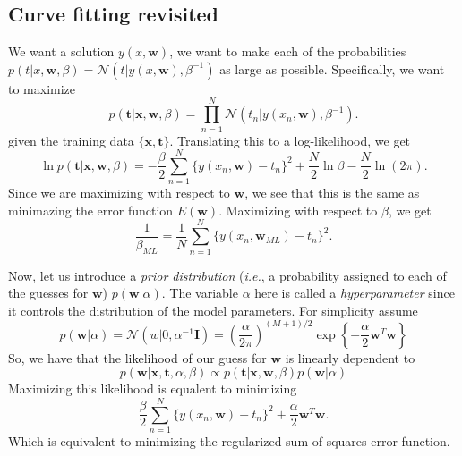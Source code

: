 \documentclass[11pt]{article}
\begin{document}
\subsection{Curve fitting revisited}
We want a solution $y(x, \textbf{w})$, we want to make each of the
probabilities
$p(t|x,\textbf{w}, \beta) = \mathcal{N}(t|y(x, \textbf{w}), \beta^{-1})$ as
large as possible. Specifically, we want to maximize
\begin{equation*}
  p(\textbf{t}|\textbf{x}, \textbf{w}, \beta) =
  \prod_{n=1}^N \mathcal{N}(t_n | y(x_n, \textbf{w}), \beta^{-1}).
\end{equation*}
given the training data $\{\textbf{x}, \textbf{t}\}$. Translating this to a
log-likelihood, we get
\begin{equation*}
  \ln p(\textbf{t}|\textbf{x}, \textbf{w}, \beta) =
  -\frac{\beta}{2}
  \sum_{n=1}^N \{y(x_n, \textbf{w}) - t_n\}^2 + \frac{N}{2} \ln \beta
  - \frac{N}{2} \ln (2\pi).
\end{equation*}
Since we are maximizing with respect to $\textbf{w}$, we see that this is the
same as minimazing the error function $E(\textbf{w})$. Maximizing with respect
to $\beta$, we get
\begin{equation*}
  \frac{1}{\beta_{ML}} =
  \frac{1}{N} \sum_{n=1}^N \{y(x_n, \textbf{w}_{ML}) - t_n\}^2.
\end{equation*}

Now, let us introduce a \textit{prior distribution} (\textit{i.e.}, a
probability assigned to each of the guesses for $\textbf{w}$)
$p(\textbf{w}|\alpha)$. The variable $\alpha$ here is called a
\textit{hyperparameter} since it controls the distribution of the model
parameters. For simplicity assume
\begin{equation*}
  p(\textbf{w}|\alpha) =
  \mathcal{N}(w|0, \alpha^{-1} \textbf{I}) =
  \left( \frac{\alpha}{2\pi}\right)^{(M+1)/2}
  \exp \left\{ -\frac{\alpha}{2}\textbf{w}^T\textbf{w} \right\}
\end{equation*}
So, we have that the likelihood of our guess for $\textbf{w}$ is linearly
dependent to
\begin{equation*}
  p(\textbf{w}|\textbf{x}, \textbf{t}, \alpha, \beta) \propto
  p(\textbf{t}|\textbf{x}, \textbf{w}, \beta)p(\textbf{w}|\alpha)
\end{equation*}
Maximizing this likelihood is equalent to minimizing
\begin{equation*}
  \frac{\beta}{2} \sum_{n=1}^N \{y(x_n, \textbf{w})-t_n\}^2 +
  \frac{\alpha}{2}\textbf{w}^T\textbf{w}.
\end{equation*}
Which is equivalent to minimizing the regularized sum-of-squares error
function.
\end{document}
